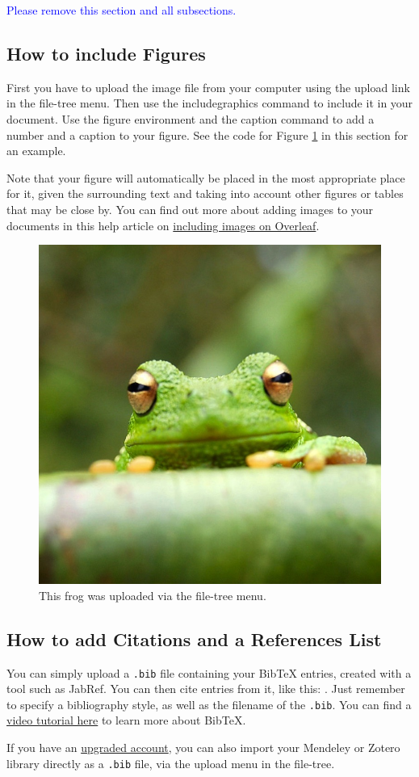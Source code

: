 \documentclass{article}
\begin{document}
\textcolor{blue}{Please remove this section and all subsections.}
\subsection{How to include Figures}

First you have to upload the image file from your computer using the upload link in the file-tree menu. Then use the includegraphics command to include it in your document. Use the figure environment and the caption command to add a number and a caption to your figure. See the code for Figure \ref{fig:frog} in this section for an example.

Note that your figure will automatically be placed in the most appropriate place for it, given the surrounding text and taking into account other figures or tables that may be close by. You can find out more about adding images to your documents in this help article on \href{https://www.overleaf.com/learn/how-to/Including_images_on_Overleaf}{including images on Overleaf}.

\begin{figure}
\centering
\includegraphics[width=0.25\linewidth]{Figures/frog.jpg}
\caption{\label{fig:frog}This frog was uploaded via the file-tree menu.}
\end{figure}


\subsection{How to add Citations and a References List}

You can simply upload a \verb|.bib| file containing your BibTeX entries, created with a tool such as JabRef. You can then cite entries from it, like this: \cite{greenwade93}. Just remember to specify a bibliography style, as well as the filename of the \verb|.bib|. You can find a \href{https://www.overleaf.com/help/97-how-to-include-a-bibliography-using-bibtex}{video tutorial here} to learn more about BibTeX.

If you have an \href{https://www.overleaf.com/user/subscription/plans}{upgraded account}, you can also import your Mendeley or Zotero library directly as a \verb|.bib| file, via the upload menu in the file-tree.




\end{document}
